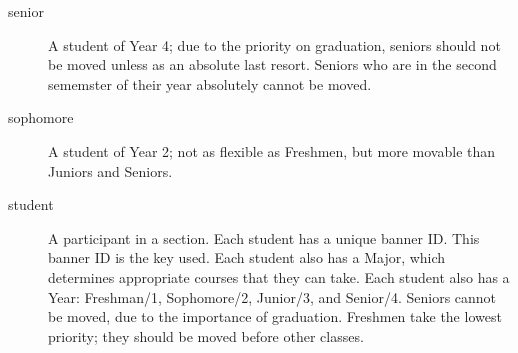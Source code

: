 \begin{description}
  \item[senior]A student of Year 4; due to the priority on graduation, seniors should not be moved unless as an absolute last resort.  Seniors who are in the second sememster of their year absolutely cannot be moved.
  \item[sophomore]A student of Year 2; not as flexible as Freshmen, but more movable than Juniors and Seniors.
  \item[student] A participant in a section.  Each student has a unique banner ID.  This banner ID is the key used.  Each student also has a Major, which determines appropriate courses that they can take.  Each student also has a Year: Freshman/1, Sophomore/2, Junior/3, and Senior/4.  Seniors cannot be moved, due to the importance of graduation.  Freshmen take the lowest priority; they should be moved before other classes.
\end{description}
